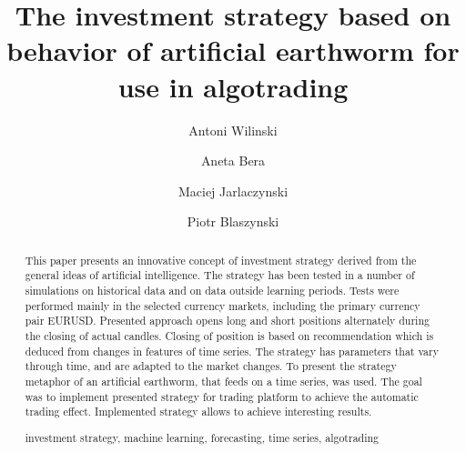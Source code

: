 \documentclass[runningheads,a4paper]{llncs}
\newcommand{\keywords}[1]{\par\addvspace\baselineskip
\noindent\keywordname\enspace\ignorespaces#1}
\begin{document}
\mainmatter  %

\title{The investment strategy based on behavior of artificial earthworm for use in algotrading}


%
%
\author{Antoni Wilinski
\and Aneta Bera\and Maciej Jarlaczynski\and Piotr Blaszynski}
%


%
%

\maketitle


\begin{abstract}
This paper presents an innovative concept of investment strategy derived from the general ideas of artificial intelligence. The strategy has been tested in a number of simulations on historical data and on data outside learning periods. Tests were performed mainly in the selected currency markets, including the primary currency pair EURUSD. Presented approach opens long and short positions alternately during the closing of actual candles. Closing of position is based on recommendation which is deduced from changes in features of time series. The strategy has parameters that vary through time, and are adapted to the market changes. To present the strategy metaphor of an artificial earthworm, that feeds on a time series, was used. The goal was to implement presented strategy for trading platform to achieve the automatic trading effect. Implemented strategy allows to achieve interesting results.
\keywords{investment strategy, machine learning, forecasting, time series, algotrading}
\end{abstract}
\end{document}
